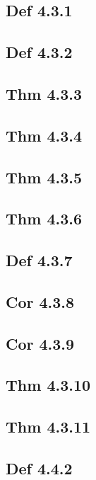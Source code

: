 \subsection*{Def 4.3.1}

\subsection*{Def 4.3.2}

\subsection*{Thm 4.3.3}

\subsection*{Thm 4.3.4}

\subsection*{Thm 4.3.5}

\subsection*{Thm 4.3.6}

\subsection*{Def 4.3.7}

\subsection*{Cor 4.3.8}

\subsection*{Cor 4.3.9}

\subsection*{Thm 4.3.10}

\subsection*{Thm 4.3.11}

\subsection*{Def 4.4.2}

